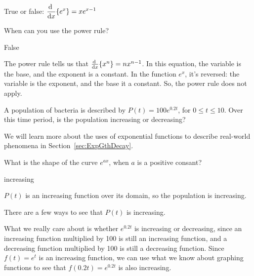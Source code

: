 \begin{question}
True or false: $\ds\diff{}{x}\{e^x\}=xe^{x-1}$
\end{question}
\begin{hint}
When can you use the power rule?
\end{hint}
\begin{answer}
False
\end{answer}
\begin{solution}
The power rule tells us that $\diff{}{x}\{x^n\}=nx^{n-1}$. In this equation, the variable is the base, and the exponent is a constant. In the function $e^x$, it's reversed: the variable is the exponent, and the base it a constant. So, the power rule does not apply.
\end{solution}



\begin{question}
A population of bacteria is described by $P(t)=100e^{0.2t}$, for $0 \leq t \leq 10$. Over this time period, is the population increasing or decreasing?

\medskip
We will learn more about the uses of exponential functions to describe real-world phenomena in Section~\ref*{sec:ExpGthDecay}.
\end{question}
\begin{hint} What is the shape of the curve $e^{ax}$, when $a$ is a positive consant?
\end{hint}
\begin{answer} increasing
\end{answer}
\begin{solution}
$P(t)$ is an increasing function over its domain, so the population is increasing.

There are a few ways to see that $P(t)$ is increasing.

 What we really care about is whether $e^{0.2t}$ is increasing or decreasing, since an increasing function multiplied by 100 is still an increasing function, and a decreasing function multiplied by 100 is still a decreasing function. Since $f(t)=e^t$ is an increasing function, we can use what we know about graphing functions to see that $f(0.2t)=e^{0.2t}$ is also increasing.
\end{solution}


\subsection*{\Procedural}

